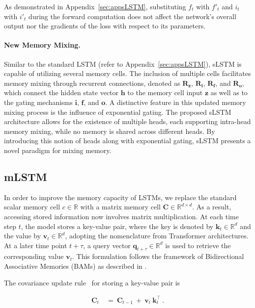As demonstrated in Appendix~\ref{sec:appsLSTM}, substituting $f_t$ with $f'_t$ and $i_t$ with $i'_t$ during the forward computation does not affect the network’s overall output nor the gradients of the loss with respect to its parameters.

\paragraph{New Memory Mixing.} Similar to the standard LSTM (refer to Appendix~\ref{sec:appsLSTM}), sLSTM is capable of utilizing several memory cells. The inclusion of multiple cells facilitates memory mixing through recurrent connections, denoted as $\mathbf{R}_{\mathbf{z}}$, $\mathbf{R}_{\mathbf{i}}$, $\mathbf{R}_{\mathbf{f}}$, and $\mathbf{R}_{\mathbf{o}}$, which connect the hidden state vector $\mathbf{h}$ to the memory cell input $\mathbf{z}$ as well as to the gating mechanisms $\mathbf{i}$, $\mathbf{f}$, and $\mathbf{o}$. A distinctive feature in this updated memory mixing process is the influence of exponential gating. The proposed sLSTM architecture allows for the existence of multiple heads, each supporting intra-head memory mixing, while no memory is shared across different heads. By introducing this notion of heads along with exponential gating, sLSTM presents a novel paradigm for mixing memory.

\subsection{mLSTM}
\label{sec:mLSTM}

In order to improve the memory capacity of LSTMs, we replace the standard scalar memory cell $c \in \mathbb{R}$ with a matrix memory cell $\mathbf{C} \in \mathbb{R}^{d \times d}$. As a result, accessing stored information now involves matrix multiplication. At each time step $t$, the model stores a key-value pair, where the key is denoted by $\mathbf{k}_t \in \mathbb{R}^d$ and the value by $\mathbf{v}_t \in \mathbb{R}^d$, adopting the nomenclature from Transformer architectures. At a later time point $t + \tau$, a query vector $\mathbf{q}_{t+\tau} \in \mathbb{R}^d$ is used to retrieve the corresponding value $\mathbf{v}_t$. This formulation follows the framework of Bidirectional Associative Memories (BAMs) as described in \citep{Kohonen:72,Anderson:72,Nakano:72,Anderson:77}.

The covariance update rule~\citep{Sejnowski:77,Dayan:91} for storing a key-value pair is

\begin{align}
\mathbf{C}_t \ &= \ \mathbf{C}_{t-1} \ + \ \mathbf{v}_{t} \ \mathbf{k}_t^\top \ .
\end{align}

